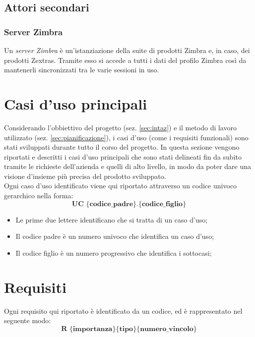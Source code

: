 \subsection{Attori secondari}
\subsubsection{Server Zimbra}
Un \emph{server Zimbra} è un'istanziazione della suite di prodotti Zimbra e, in
caso, dei prodotti Zextras. Tramite esso si accede a tutti i dati del profilo
Zimbra così da mantenerli sincronizzati tra le varie sessioni in uso.

\section{Casi d'uso principali}
Considerando l'obbiettivo del progetto (sez. \ref{sec:intaz}) e il metodo di 
lavoro utilizzato (sez. \ref{sec:pianificazione}), i casi d'uso (come i
requisiti funzionali) sono stati sviluppati durante tutto il corso del progetto.
In questa sezione vengono riportati e descritti i casi d'uso principali che 
sono stati delineati fin da subito tramite le richieste dell'azienda e quelli 
di alto livello, in modo da poter dare una visione d’insieme più precisa del 
prodotto sviluppato. \\

Ogni caso d'uso identificato viene qui riportato attraverso un codice univoco 
gerarchico nella forma:
$$ \textbf{UC \{codice\_padre\}.\{codice\_figlio\}  } $$
\begin{itemize}
	\item Le prime due lettere identificano che si tratta di un caso d'uso;
	\item Il codice padre è un numero univoco che identifica un caso d'uso;
	\item Il codice figlio è un numero progressivo che identifica i sottocasi;\\
\end{itemize}




\section{Requisiti}
Ogni requisito qui riportato è identificato da un codice, ed è rappresentato nel seguente modo:
$$ \textbf{R \{importanza\}\{tipo\}\{numero\_vincolo\} } $$

